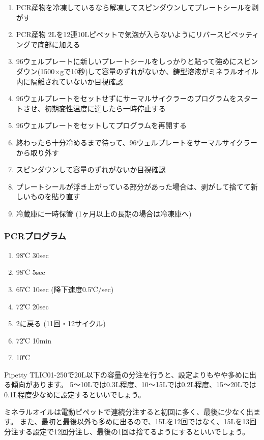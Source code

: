 \documentclass[titlepage,10pt,a4paper,uplatex]{jsbook}
\begin{document}
\begin{enumerate}
\item PCR産物を冷凍しているなら解凍してスピンダウンしてプレートシールを剥がす
\item PCR産物 2{\textmu}Lを12連10{\textmu}Lピペットで気泡が入らないようにリバースピペッティングで底部に加える
\item 96ウェルプレートに新しいプレートシールをしっかりと貼って強めにスピンダウン(1500×gで10秒)して容量のずれがないか、鋳型溶液がミネラルオイル内に隔離されていないか目視確認
\item 96ウェルプレートをセットせずにサーマルサイクラーのプログラムをスタートさせ、初期変性温度に達したら一時停止する
\item 96ウェルプレートをセットしてプログラムを再開する
\item 終わったら十分冷めるまで待って、96ウェルプレートをサーマルサイクラーから取り外す
\item スピンダウンして容量のずれがないか目視確認
\item プレートシールが浮き上がっている部分があった場合は、剥がして捨てて新しいものを貼り直す
\item 冷蔵庫に一時保管 (1ヶ月以上の長期の場合は冷凍庫へ)
\end{enumerate}

\subsubsection{PCRプログラム}
\begin{enumerate}
\item 98℃ 30sec
\item 98℃ 5sec
\item 65℃ 10sec (降下速度0.5℃/sec)
\item 72℃ 20sec
\item 2に戻る (11回・12サイクル)
\item 72℃ 10min
\item 10℃
\end{enumerate}

Pipetty TLIC01-250で20{\textmu}L以下の容量の分注を行うと、設定よりもやや多めに出る傾向があります。
5～10{\textmu}Lでは0.3{\textmu}L程度、10～15{\textmu}Lでは0.2{\textmu}L程度、15～20{\textmu}Lでは0.1{\textmu}L程度少なめに設定するといいでしょう。

ミネラルオイルは電動ピペットで連続分注すると初回に多く、最後に少なく出ます。
また、最初と最後以外も多めに出るので、15{\textmu}Lを12回ではなく、15{\textmu}Lを13回分注する設定で12回分注し、最後の1回は捨てるようにするといいでしょう。
\end{document}
